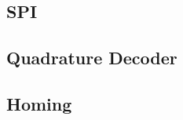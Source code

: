 \documentclass[../../main]{subfiles}
\begin{document}
\label{sec:controller_design}


\subsection{SPI}%
\label{sub:spi}







\subsection{Quadrature Decoder}%
\label{sub:quadraturdecoder}


\subsection{Homing}
\label{sub:homing}

\end{document}
